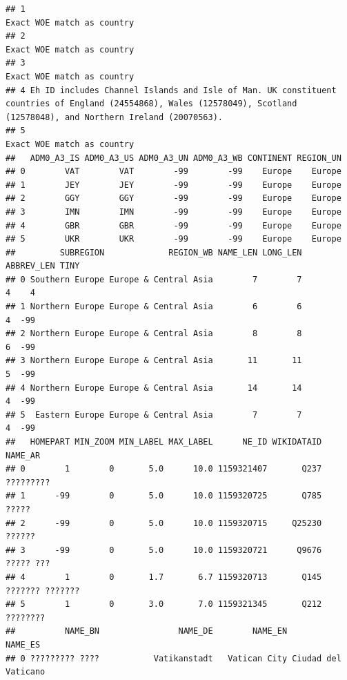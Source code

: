 \documentclass[
]{book}
\begin{document}
\begin{verbatim}
## 1                                                                                                                                              Exact WOE match as country
## 2                                                                                                                                              Exact WOE match as country
## 3                                                                                                                                              Exact WOE match as country
## 4 Eh ID includes Channel Islands and Isle of Man. UK constituent countries of England (24554868), Wales (12578049), Scotland (12578048), and Northern Ireland (20070563).
## 5                                                                                                                                              Exact WOE match as country
##   ADM0_A3_IS ADM0_A3_US ADM0_A3_UN ADM0_A3_WB CONTINENT REGION_UN
## 0        VAT        VAT        -99        -99    Europe    Europe
## 1        JEY        JEY        -99        -99    Europe    Europe
## 2        GGY        GGY        -99        -99    Europe    Europe
## 3        IMN        IMN        -99        -99    Europe    Europe
## 4        GBR        GBR        -99        -99    Europe    Europe
## 5        UKR        UKR        -99        -99    Europe    Europe
##         SUBREGION             REGION_WB NAME_LEN LONG_LEN ABBREV_LEN TINY
## 0 Southern Europe Europe & Central Asia        7        7          4    4
## 1 Northern Europe Europe & Central Asia        6        6          4  -99
## 2 Northern Europe Europe & Central Asia        8        8          6  -99
## 3 Northern Europe Europe & Central Asia       11       11          5  -99
## 4 Northern Europe Europe & Central Asia       14       14          4  -99
## 5  Eastern Europe Europe & Central Asia        7        7          4  -99
##   HOMEPART MIN_ZOOM MIN_LABEL MAX_LABEL      NE_ID WIKIDATAID         NAME_AR
## 0        1        0       5.0      10.0 1159321407       Q237       ?????????
## 1      -99        0       5.0      10.0 1159320725       Q785           ?????
## 2      -99        0       5.0      10.0 1159320715     Q25230          ??????
## 3      -99        0       5.0      10.0 1159320721      Q9676       ????? ???
## 4        1        0       1.7       6.7 1159320713       Q145 ??????? ???????
## 5        1        0       3.0       7.0 1159321345       Q212        ????????
##          NAME_BN                NAME_DE        NAME_EN             NAME_ES
## 0 ????????? ????           Vatikanstadt   Vatican City Ciudad del Vaticano

\end{verbatim}
\end{document}
